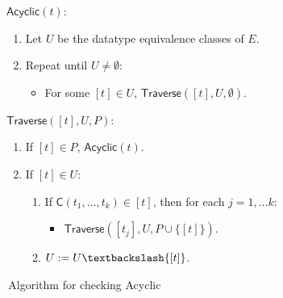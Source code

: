 \documentclass[smallcondensed,draft]{svjour3}
\newcommand\const[1]{\textsf{#1}}
\newcommand{\Ec}{E}
\newcommand{\rn}[1]{\textsf{#1}}
\newcommand{\ec}[1]{[#1]}
\begin{document}
\begin{figure}[t!]
\normalsize
\centering
\flushleft $\rn{Acyclic}(t)$:

\vspace*{-\topsep}

\begin{enumerate}
\item Let $U$ be the datatype equivalence classes of $\Ec$.
\item Repeat until $U \neq \emptyset$:
\begin{itemize}
\item[\ ] For some $\ec{t} \in U$, $\rn{Traverse}( \ec{t}, U, \emptyset )$.
\end{itemize}
\end{enumerate}

\flushleft $\rn{Traverse}( \ec{t}, U, P )$:

\vspace*{-\topsep}

\begin{enumerate}
\item If $\ec{t} \in P$, $\rn{Acyclic}(t)$.
\item If $\ec{t} \in U$:
\begin{enumerate}
\item[2.1.] If $\const{C}( t_1, \ldots, t_k ) \in \ec{t}$, then for each $j = 1, \ldots k$:
\begin{itemize}
\item[2.1.1.] $\rn{Traverse}( \ec{t_j}, U, P \cup \{ \ec{t} \} )$.
\end{itemize}
\item[2.2.] $U := U \textbackslash \{ \ec{t} \}$.
\end{enumerate}
\end{enumerate}
\vspace*{-\topsep}
\caption{\,Algorithm for checking \rn{Acyclic}}
\label{fig:acyclic-algo}
\end{figure}
\end{document}
